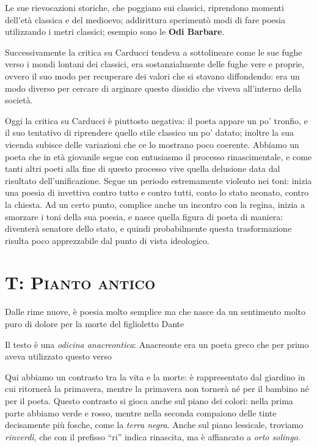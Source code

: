 \documentclass{book}
\begin{document}
Le sue rievocazioni storiche, che poggiano sui classici, riprendono
momenti dell'età classica e del medioevo; addirittura sperimentò modi di
fare poesia utilizzando i metri classici; esempio sono le \textbf{Odi
Barbare}.

Successivamente la critica su Carducci tendeva a sottolineare come le
sue fughe verso i mondi lontani dei classici, era sostanzialmente delle
fughe vere e proprie, ovvero il suo modo per recuperare dei valori che
si stavano diffondendo: era un modo diverso per cercare di arginare
questo dissidio che viveva all'interno della società.

Oggi la critica su Carducci è piuttosto negativa: il poeta appare un po'
tronfio, e il suo tentativo di riprendere quello stile classico un po'
datato; inoltre la sua vicenda subisce delle variazioni che ce lo
mostrano poco coerente. Abbiamo un poeta che in età giovanile segue con
entusiasmo il processo rinascimentale, e come tanti altri poeti alla
fine di questo processo vive quella delusione data dal risultato
dell'unificazione. Segue un periodo estremamente violento nei toni:
inizia una poesia di invettiva contro tutto e contro tutti, conto lo
stato neonato, contro la chiesta. Ad un certo punto, complice anche un
incontro con la regina, inizia a smorzare i toni della sua poesia, e
nasce quella figura di poeta di maniera: diventerà senatore dello stato,
e quindi probabilmente questa trasformazione risulta poco apprezzabile
dal punto di vista ideologico.

\section{T: \textsc{Pianto antico}}

Dalle rime nuove, è poesia molto semplice ma che nasce da un sentimento
molto puro di dolore per la morte del figlioletto Dante

Il testo è una \emph{odicina anacreontica}: Anacreonte era un poeta
greco che per primo aveva utilizzato questo verso

Qui abbiamo un contrasto tra la vita e la morte: è rappresentato dal
giardino in cui ritornerà la primavera, mentre la primavera non tornerà
né per il bambino né per il poeta. Questo contrasto si gioca anche sul
piano dei colori: nella prima parte abbiamo verde e rosso, mentre nella
seconda compaiono delle tinte decisamente più fosche, come la
\emph{terra negra}. Anche sul piano lessicale, troviamo \emph{rinverdì},
che con il prefisso ``ri'' indica rinascita, ma è affiancato a
\emph{orto solingo}.
\end{document}
